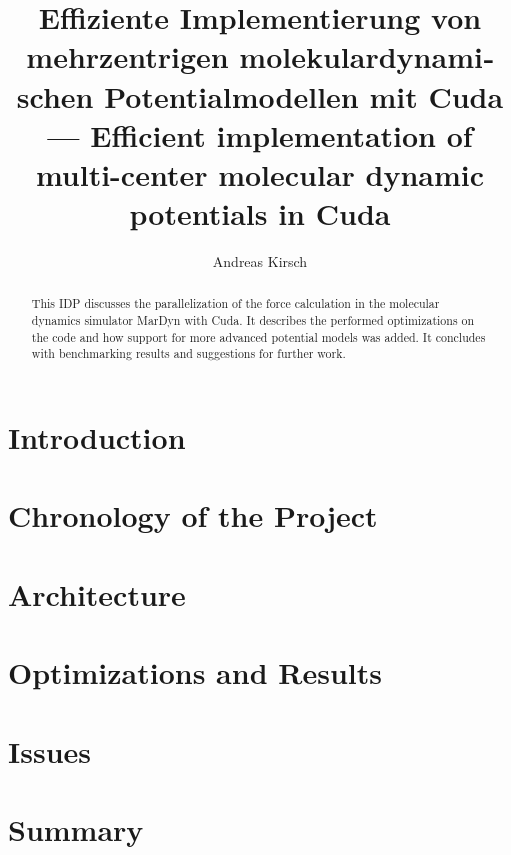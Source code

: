 \documentclass[11pt,a4paper,onecolumn,notitlepage]{elsarticle}
\author{Andreas Kirsch}
\title{\foreignlanguage{ngerman}{Effiziente Implementierung von mehrzentrigen molekulardynamischen Potentialmodellen mit Cuda} \linebreak --- Efficient implementation of multi-center molecular dynamic potentials in Cuda}
\newcommand{\cuda}{Cuda}
\begin{document}
\begin{abstract}
This IDP discusses the parallelization of the force calculation in the molecular dynamics simulator MarDyn with \cuda. It describes the performed optimizations on the code and how support for more advanced potential models was added. It concludes with benchmarking results and suggestions for further work.
\end{abstract}

\maketitle

\section{Introduction}

\section{Chronology of the Project}

\section{Architecture}

\section{Optimizations and Results}

\section{Issues}

\section{Summary}
\end{document}
